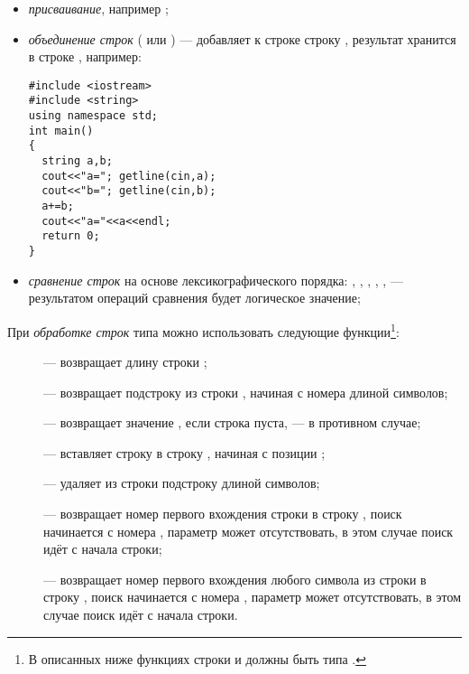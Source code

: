 \begin{itemize}
\item \emph{присваивание}, например ;
\item \emph{объединение строк} ( или ) --- добавляет к
строке  строку , результат хранится в строке , например:
\begin{lstlisting}
#include <iostream>
#include <string>
using namespace std;
int main()
{
  string a,b;
  cout<<"a="; getline(cin,a);
  cout<<"b="; getline(cin,b);
  a+=b;
  cout<<"a="<<a<<endl;
  return 0;
}
\end{lstlisting}

\item \emph{сравнение строк} на основе лексикографического порядка:
, ,
, , ,
 --- результатом операций сравнения будет логическое значение;
\end{itemize}
При \emph{обработке строк }типа  можно использовать следующие
функции\footnote{В описанных ниже функциях строки  и  должны быть типа .}:
\begin{description}
\item[] --- возвращает длину строки ;
\item[] --- возвращает подстроку из строки , начиная с номера
  длиной  символов;
\item[] --- возвращает значение , если строка  пуста,
 --- в противном случае;
\item[] --- вставляет строку  в строку , начиная с
позиции ;
\item[] --- удаляет из строки  подстроку  длиной
 символов;
\item[] --- возвращает номер первого вхождения строки  в строку
, поиск начинается с номера , параметр  может
отсутствовать, в этом случае поиск идёт с начала строки;
\item[] --- возвращает номер первого вхождения любого символа из строки
 в строку , поиск начинается с номера , параметр
 может отсутствовать, в этом случае поиск идёт с начала строки.
\end{description}

